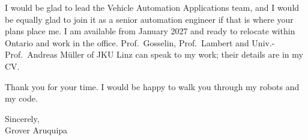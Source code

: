 \documentclass[11pt,letterpaper]{article}
\begin{document}
I would be glad to lead the Vehicle Automation Applications team, and I would be equally glad to join it as a senior automation engineer if that is where your plans place me. I am available from January 2027 and ready to relocate within Ontario and work in the office. Prof.\ Gosselin, Prof.\ Lambert and Univ.-Prof.\ Andreas M\"uller of JKU Linz can speak to my work; their details are in my CV.

Thank you for your time. I would be happy to walk you through my robots and my code.

Sincerely,\\
Grover Aruquipa
\end{document}
